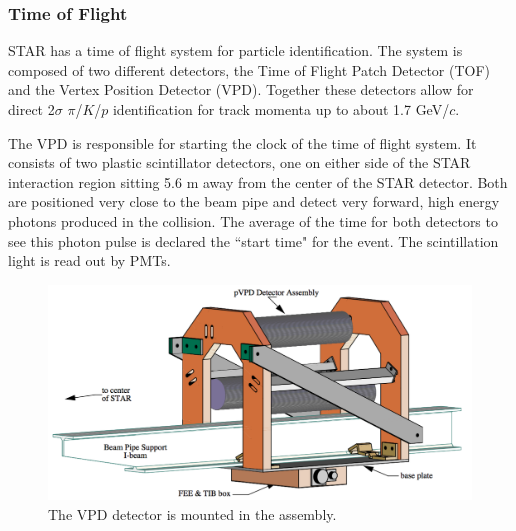 \documentclass[abstract = on,listof=totoc, bibliography=totoc]{scrreprt}
\begin{document}
\FloatBarrier

\subsubsection[TOF]{Time of Flight}

STAR has a time of flight system for particle identification. The system is composed of two different detectors, the Time of Flight Patch Detector (TOF) and the Vertex Position Detector (VPD).  Together these detectors allow for direct 2$\sigma$ $\pi$/$K$/$p$ identification for track momenta up to about 1.7 GeV/$c$.

The VPD is responsible for starting the clock of the time of flight system. It consists of two plastic scintillator detectors, one on either side of the STAR interaction region sitting 5.6 m away from the center of the STAR detector. Both are positioned very close to the beam pipe and detect very forward, high energy photons produced in the collision. The average of the time for both detectors to see this photon pulse is declared the ``start time" for the event. The scintillation light is read out by PMTs. 


\begin{figure}
\begin{center}
\includegraphics[width = .6\textwidth]{vpdAssembly}
\caption[VPD Assembly]{The VPD detector is mounted in the assembly.}
\label{fig:vpdAssembly}
\end{center}
\end{figure}
\end{document}
